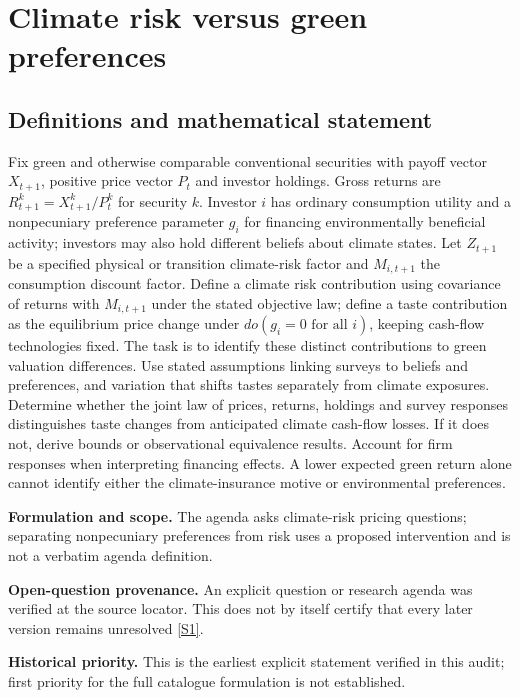 \documentclass[11pt]{article}
\newcommand{\sref}[2]{\hyperlink{source:#1:#2}{[S#2]}}
\begin{document}
\section*{Climate risk versus green preferences}\label{30007600}
\subsection{Definitions and mathematical statement}
Fix green and otherwise comparable conventional securities with payoff vector \(X_{t+1}\), positive price vector \(P_t\) and investor holdings. Gross returns are \(R^k_{t+1}=X^k_{t+1}/P^k_t\) for security \(k\). Investor \(i\) has ordinary consumption utility and a nonpecuniary preference parameter \(g_i\) for financing environmentally beneficial activity; investors may also hold different beliefs about climate states. Let \(Z_{t+1}\) be a specified physical or transition climate-risk factor and \(M_{i,t+1}\) the consumption discount factor. Define a climate risk contribution using covariance of returns with \(M_{i,t+1}\) under the stated objective law; define a taste contribution as the equilibrium price change under \(do(g_i=0\text{ for all }i)\), keeping cash-flow technologies fixed. The task is to identify these distinct contributions to green valuation differences. Use stated assumptions linking surveys to beliefs and preferences, and variation that shifts tastes separately from climate exposures. Determine whether the joint law of prices, returns, holdings and survey responses distinguishes taste changes from anticipated climate cash-flow losses. If it does not, derive bounds or observational equivalence results. Account for firm responses when interpreting financing effects. A lower expected green return alone cannot identify either the climate-insurance motive or environmental preferences.

\par\textbf{Formulation and scope.} The agenda asks climate-risk pricing questions; separating nonpecuniary preferences from risk uses a proposed intervention and is not a verbatim agenda definition.

\par\textbf{Open-question provenance.} An explicit question or research agenda was verified at the source locator. This does not by itself certify that every later version remains unresolved \sref{30007600}{1}.

\par\textbf{Historical priority.} This is the earliest explicit statement verified in this audit; first priority for the full catalogue formulation is not established.
\end{document}
